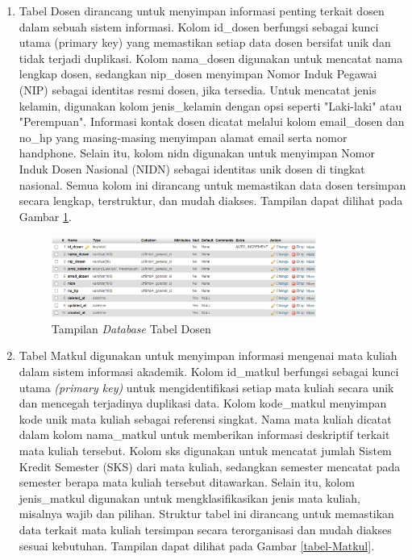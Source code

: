 \begin{enumerate}

	\item Tabel Dosen dirancang untuk menyimpan informasi penting terkait dosen dalam sebuah sistem informasi. Kolom id\_dosen berfungsi sebagai kunci utama (primary key) yang memastikan setiap data dosen bersifat unik dan tidak terjadi duplikasi. Kolom nama\_dosen digunakan untuk mencatat nama lengkap dosen, sedangkan nip\_dosen menyimpan Nomor Induk Pegawai (NIP) sebagai identitas resmi dosen, jika tersedia. Untuk mencatat jenis kelamin, digunakan kolom jenis\_kelamin dengan opsi seperti "Laki-laki" atau "Perempuan". Informasi kontak dosen dicatat melalui kolom email\_dosen dan no\_hp yang masing-masing menyimpan alamat email serta nomor handphone. Selain itu, kolom nidn digunakan untuk menyimpan Nomor Induk Dosen Nasional (NIDN) sebagai identitas unik dosen di tingkat nasional. Semua kolom ini dirancang untuk memastikan data dosen tersimpan secara lengkap, terstruktur, dan mudah diakses. Tampilan dapat dilihat pada Gambar \ref{tabel-Dosen}.

	      \begin{figure}
		      \centering
		      \includegraphics[width=0.82\textwidth]{konten/gambar/implementasi/tabel-dosen.png}
		      \caption{Tampilan \textit{Database} Tabel Dosen}
		      \label{tabel-Dosen}
	      \end{figure}


	\item Tabel Matkul digunakan untuk menyimpan informasi mengenai mata kuliah dalam sistem informasi akademik. Kolom id\_matkul berfungsi sebagai kunci utama \textit{(primary key)} untuk mengidentifikasi setiap mata kuliah secara unik dan mencegah terjadinya duplikasi data. Kolom kode\_matkul menyimpan kode unik mata kuliah sebagai referensi singkat. Nama mata kuliah dicatat dalam kolom nama\_matkul untuk memberikan informasi deskriptif terkait mata kuliah tersebut. Kolom sks digunakan untuk mencatat jumlah Sistem Kredit Semester (SKS) dari mata kuliah, sedangkan semester mencatat pada semester berapa mata kuliah tersebut ditawarkan. Selain itu, kolom jenis\_matkul digunakan untuk mengklasifikasikan jenis mata kuliah, misalnya wajib dan pilihan. Struktur tabel ini dirancang untuk memastikan data terkait mata kuliah tersimpan secara terorganisasi dan mudah diakses sesuai kebutuhan. Tampilan dapat dilihat pada Gambar \ref{tabel-Matkul}.


\end{enumerate}
